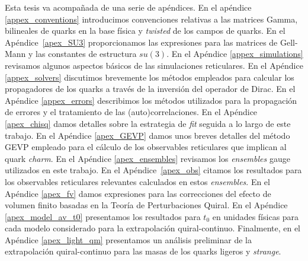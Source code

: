 Esta tesis va acompañada de una serie de apéndices. En el apéndice \ref{appex_conventions} introducimos convenciones relativas a las matrices Gamma, bilineales de quarks en la base física y \textit{twisted} de los campos de quarks. En el Apéndice~\ref{apex_SU3} proporcionamos las expresiones para las matrices de Gell-Mann y las constantes de estructura $su(3)$. En el Apéndice \ref{appex_simulations} revisamos algunos aspectos básicos de las simulaciones reticulares. En el Apéndice \ref{appex_solvers} discutimos brevemente los métodos empleados para calcular los propagadores de los quarks a través de la inversión del operador de Dirac. En el Apéndice \ref{appex_errors} describimos los métodos utilizados para la propagación de errores y el tratamiento de las (auto)correlaciones. En el Apéndice \ref{apex_chisq} damos detalles sobre la estrategia de \textit{fit} seguida a lo largo de este trabajo. En el Apéndice \ref{apex_GEVP} damos unos breves detalles del método GEVP empleado para el cálculo de los observables reticulares que implican al quark \textit{charm}. En el Apéndice \ref{apex_ensembles} revisamos los \textit{ensembles} gauge utilizados en este trabajo. En el Apéndice~\ref{apex_obs} citamos los resultados para los observables reticulares relevantes calculados en estos \textit{ensembles}. En el Apéndice \ref{apex_fv} damos expresiones para las correcciones del efecto de volumen finito basadas en la Teoría de Perturbaciones Quiral. En el Apéndice \ref{apex_model_av_t0} presentamos los resultados para $t_0$ en unidades físicas para cada modelo considerado para la extrapolación quiral-continuo. Finalmente, en el Apéndice \ref{apex_light_qm} presentamos un análisis preliminar de la extrapolación quiral-continuo para las masas de los quarks ligeros y \textit{strange}. 
